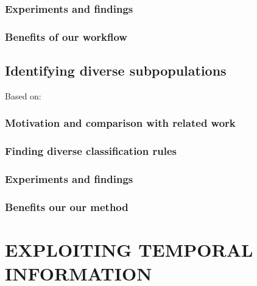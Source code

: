 \documentclass[
]{book}
\begin{document}
\hypertarget{experiments-and-findings}{%
\section{Experiments and findings}\label{experiments-and-findings}}

\hypertarget{benefits-of-our-workflow}{%
\section{Benefits of our workflow}\label{benefits-of-our-workflow}}

\hypertarget{sdclu}{%
\chapter{Identifying diverse subpopulations}\label{sdclu}}

Based on: \autocite{Niemann:CBMS2017}

\hypertarget{motivation-and-comparison-with-related-work-1}{%
\section{Motivation and comparison with related work}\label{motivation-and-comparison-with-related-work-1}}

\hypertarget{finding-diverse-classification-rules}{%
\section{Finding diverse classification rules}\label{finding-diverse-classification-rules}}

\hypertarget{experiments-and-findings-1}{%
\section{Experiments and findings}\label{experiments-and-findings-1}}

\hypertarget{benefits-our-our-method}{%
\section{Benefits our our method}\label{benefits-our-our-method}}

\hypertarget{part-exploiting-temporal-information}{%
\part{EXPLOITING TEMPORAL INFORMATION}\label{part-exploiting-temporal-information}}
\end{document}
